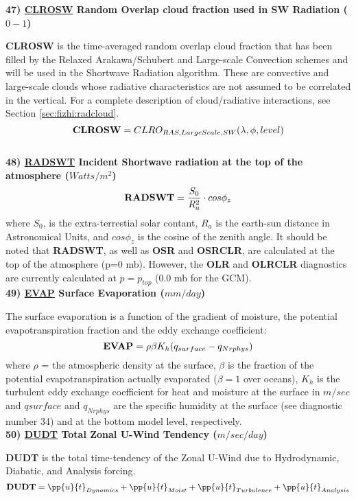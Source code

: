\noindent
{\bf 47) \underline {CLROSW} Random Overlap cloud fraction used in SW Radiation ($0-1$) }

\noindent
{\bf CLROSW} is the time-averaged random overlap cloud fraction that has been filled by the Relaxed
Arakawa/Schubert and Large-scale Convection schemes and will be used in the Shortwave 
Radiation algorithm.  These are
convective and large-scale clouds whose radiative characteristics are not 
assumed to be correlated in the vertical.
For a complete description of cloud/radiative interactions, see Section \ref{sec:fizhi:radcloud}.
\[
{\bf CLROSW} = CLRO_{RAS,Large Scale,SW}(\lambda, \phi,  level )
\]
\\

\noindent
{\bf 48)  \underline {RADSWT} Incident Shortwave radiation at the top of the atmosphere ($Watts/m^2$) }
\[
{\bf RADSWT} = {\frac{S_0}{R_a^2}} \cdot cos \phi_z
\]
\noindent
where $S_0$, is the extra-terrestial solar contant,
$R_a$ is the earth-sun distance in Astronomical Units,
and $cos \phi_z$ is the cosine of the zenith angle.
It should be noted that {\bf RADSWT}, as well as
{\bf OSR} and {\bf OSRCLR}, 
are calculated at the top of the atmosphere (p=0 mb).  However, the
{\bf OLR} and {\bf OLRCLR} diagnostics are currently
calculated at $p= p_{top}$ (0.0 mb for the GCM).
\\
   
\noindent
{\bf 49)  \underline {EVAP}  Surface Evaporation ($mm/day$) }

\noindent
The surface evaporation is a function of the gradient of moisture, the potential 
evapotranspiration fraction and the eddy exchange coefficient:
\[
{\bf EVAP} =  \rho \beta K_{h} (q_{surface} - q_{Nrphys})
\]
where $\rho$ = the atmospheric density at the surface, $\beta$ is the fraction of
the potential evapotranspiration actually evaporated ($\beta=1$ over oceans), $K_{h}$ is the 
turbulent eddy exchange coefficient for heat and moisture at the surface in $m/sec$ and 
$q{surface}$ and $q_{Nrphys}$ are the specific humidity at the surface (see diagnostic
number 34) and at the bottom model level, respectively.
\\

\noindent
{\bf 50)  \underline {DUDT} Total Zonal U-Wind Tendency  ($m/sec/day$) }

\noindent
{\bf DUDT} is the total time-tendency of the Zonal U-Wind due to Hydrodynamic, Diabatic,
and Analysis forcing.
\[
{\bf DUDT} = \pp{u}{t}_{Dynamics} + \pp{u}{t}_{Moist} + \pp{u}{t}_{Turbulence} + \pp{u}{t}_{Analysis} 
\]
\\


